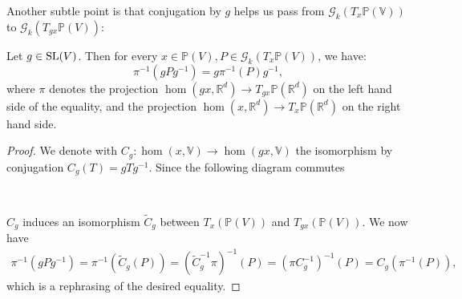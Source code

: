 \documentclass{report}
\begin{document}
Another subtle point is that conjugation by $g$ helps us pass from $\mathcal G_k(T_x \mathbb P(\mathbb V))$ to $\mathcal G_k(T_{gx} \mathbb P(V))$:
\begin{lemma}
    Let $g \in \operatorname{{\mathrm{SL}}}(V)$.
    Then for every $x \in \mathbb P(V), P \in \mathcal G_k(T_x \mathbb P(V))$, we have:
    \[
    \pi^{-1}(g P g^{-1}) = g \pi^{-1}(P) g^{-1}, 
    \]
    where $\pi$ denotes the projection $\hom(gx, \mathbb R^d) \to T_{gx} \mathbb P(\mathbb R^d)$ on the left hand side of the equality, and the projection $\hom(x, \mathbb R^d) \to T_{x} \mathbb P(\mathbb R^d)$ on the right hand side.
\end{lemma}
\begin{proof}
    We denote with $C_g: \hom(x, \mathbb V) \to \hom(gx, \mathbb V)$ the isomorphism by conjugation $C_g(T) = g T g^{-1}$.
    Since the following diagram commutes\\
    \begin{center}
        \\    
    \end{center}
    $C_g$ induces an isomorphism $\tilde C_g$ between
    $ T_x (\mathbb P(V))$ and $T_{gx} (\mathbb P(V))$.
    We now have
    \begin{align*}
        \pi^{-1}(gPg^{-1}) = \pi^{-1}\left(\tilde C_g(P)\right) = (\tilde C_g^{-1} \pi)^{-1}(P) = (\pi C_g^{-1})^{-1}(P) = C_g \left( \pi^{-1}(P) \right),
    \end{align*}
    which is a rephrasing of the desired equality.
\end{proof}
\end{document}
